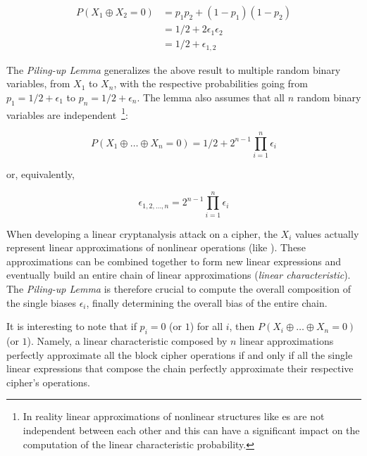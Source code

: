             \begin{align*}
                P(X_1 \oplus X_2 = 0)   &= p_1p_2 + (1-p_1)(1-p_2) \\
                                        &= 1/2 + 2\epsilon_1\epsilon_2 \\
                                        &= 1/2 + \epsilon_{1,2}
            \end{align*}

            The \emph{Piling-up Lemma} generalizes the above result to multiple random binary variables, from $X_1$ to $X_n$, with the respective probabilities going from $p_1 = 1/2 + \epsilon_1$ to $p_n = 1/2 + \epsilon_n$. The lemma also assumes that all $n$ random binary variables are independent~\footnote{In reality linear approximations of nonlinear structures like \sbocs{}es are not independent between each other and this can have a significant impact on the computation of the linear characteristic probability.}:

            \begin{equation}
                P(X_1 \oplus \dots \oplus X_n = 0) = 1/2 + 2^{n-1} \prod_{i=1}^{n} \epsilon_i
            \end{equation}

            or, equivalently,

            \begin{equation}
                \epsilon_{1,2, \dots, n} = 2^{n-1} \prod_{i=1}^{n} \epsilon_i
            \end{equation}

            When developing a linear cryptanalysis attack on a cipher, the $X_i$ values actually represent linear approximations of nonlinear operations (like \aes{} \sbocs{}). These approximations can be combined together to form new linear expressions and eventually build an entire chain of linear approximations (\emph{linear characteristic}). The \emph{Piling-up Lemma} is therefore crucial to compute the overall composition of the single biases $\epsilon_i$, finally determining the overall bias of the entire chain.

            It is interesting to note that if $p_i = 0$ (or $1$) for all $i$, then $P(X_i \oplus \dots \oplus X_n = 0)$ (or $1$). Namely, a linear characteristic composed by $n$ linear approximations perfectly approximate all the block cipher operations if and only if all the single linear expressions that compose the chain perfectly approximate their respective cipher's operations. 
            

